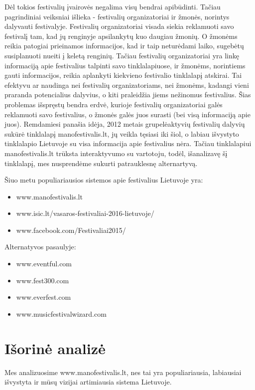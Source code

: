 \documentclass{VUMIFPSkursinis}
\begin{document}
Dėl tokios festivalių įvairovės negalima visų bendrai apibūdinti. Tačiau pagrindiniai veiksniai išlieka - festivalių organizatoriai ir žmonės, norintys dalyvauti festivalyje. 
Festivalių organizatoriai visada siekia reklamuoti savo festivalį tam, kad jų renginyje apsilankytų kuo daugiau žmonių. 
O žmonėms reikia patogiai prieinamos informacijos, kad ir taip neturėdami laiko, sugebėtų susiplanuoti nueiti į keletą renginių. 
Tačiau festivalių organizatoriai yra linkę informaciją apie festivalius talpinti savo tinklalapiuose, ir žmonėms, norintiems gauti informacijos, reikia aplankyti kiekvieno festivalio tinklalapį atskirai. 
Tai efektyvu ar naudinga nei festivalių organizatoriams, nei žmonėms, kadangi vieni praranda potencialius dalyvius, o kiti praleidžia jiems nežinomus festivalius. 
Šias problemas išspręstų bendra erdvė, kurioje festivalių organizatoriai galės reklamuoti savo festivalius, o žmonės galės juos surasti (bei visą informaciją apie juos). 
Remdamiesi panašia idėja, 2012 metais grupelėaktyvių festivalių dalyvių sukūrė tinklalapį manofestivalis.lt, jų veikla tęsiasi iki šiol, o labiau išvystyto tinklalapio Lietuvoje su visa informacija apie festivalius nėra. 
Tačiau tinklalapiui manofestivalis.lt trūksta interaktyvumo su vartotoju, todėl, išanalizavę šį tinklalapį, mes nusprendėme sukurti patrauklesnę alternartyvą. 

\vspace{5mm} 

\noindent
Šiuo metu populiariausios sistemos apie festivalius Lietuvoje yra:

\begin{itemize}
\item www.manofestivalis.lt
\item www.isic.lt/vasaros-festivaliai-2016-lietuvoje/
\item www.facebook.com/Festivaliai2015/
\end{itemize}

\noindent
Alternatyvos pasaulyje:

\begin{itemize}
\item www.eventful.com
\item www.fest300.com
\item www.everfest.com
\item www.musicfestivalwizard.com
\end{itemize}

\section{Išorinė analizė}
Mes analizuosime www.manofestivalis.lt, nes tai yra populiariausia, labiausiai išvystyta ir mūsų vizijai artimiausia sistema Lietuvoje.
\end{document}
